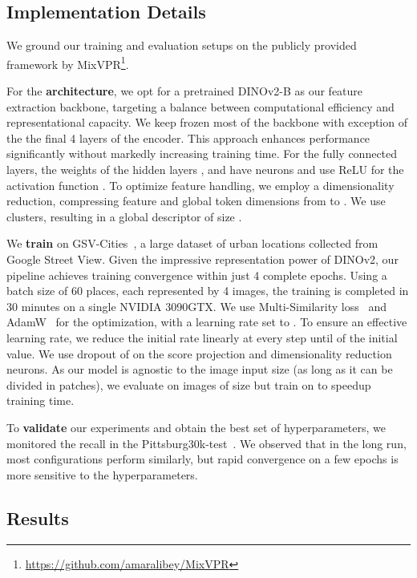 \documentclass[10pt,twocolumn,letterpaper]{article}
\begin{document}
\subsection{Implementation Details}
\label{subsec:implementation}

We ground our training and evaluation setups on the publicly provided framework by MixVPR\footnote{\url{https://github.com/amaralibey/MixVPR}}. 

For the \textbf{architecture}, we opt for a pretrained \mbox{DINOv2-B} as our feature extraction backbone, targeting a balance between computational efficiency and representational capacity. We keep frozen most of the backbone with exception of the the final 4 layers of the encoder. This approach enhances performance significantly without markedly increasing training time. For the fully connected layers, the weights of the hidden layers ,  and  have  neurons and use ReLU for the activation function . 
To optimize feature handling, we employ a dimensionality reduction, compressing feature and global token dimensions from  to . We use  clusters, resulting in a global descriptor of size .

We \textbf{train} on GSV-Cities~\cite{ali2022gsv}, a large dataset of urban locations collected from Google Street View. Given the impressive representation power of DINOv2, our pipeline achieves training convergence within just 4 complete epochs. Using a batch size of 60 places, each represented by 4 images, the training is completed in 30 minutes on a single NVIDIA 3090GTX. We use Multi-Similarity loss~\cite{wang2019multi} and AdamW~\cite{loshchilov2017decoupled} for the optimization, with a learning rate set to . To ensure an effective learning rate, we reduce the initial rate linearly at every step until  of the initial value. We use dropout of  on the score projection and dimensionality reduction neurons. As our model is agnostic to the image input size (as long as it can be divided in  patches), we evaluate on images of size  but train on  to speedup training time.

To \textbf{validate} our experiments and obtain the best set of hyperparameters, we monitored the recall in the Pittsburg30k-test~\cite{torii2013visual}. We observed that in the long run, most configurations perform similarly, but rapid convergence on a few epochs is more sensitive to the hyperparameters.

\subsection{Results}
\label{subsec:results}
\end{document}
